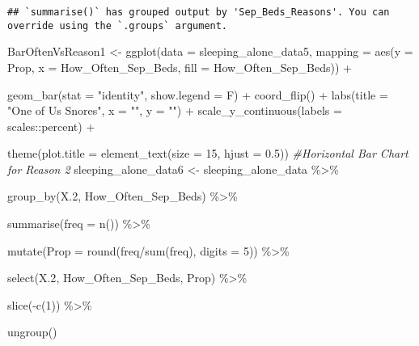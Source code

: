 \documentclass[
]{article}
\newenvironment{Shaded}{\begin{snugshade}}{\end{snugshade}}
\newcommand{\AttributeTok}[1]{\textcolor[rgb]{0.77,0.63,0.00}{#1}}
\newcommand{\CommentTok}[1]{\textcolor[rgb]{0.56,0.35,0.01}{\textit{#1}}}
\newcommand{\DecValTok}[1]{\textcolor[rgb]{0.00,0.00,0.81}{#1}}
\newcommand{\FloatTok}[1]{\textcolor[rgb]{0.00,0.00,0.81}{#1}}
\newcommand{\FunctionTok}[1]{\textcolor[rgb]{0.00,0.00,0.00}{#1}}
\newcommand{\NormalTok}[1]{#1}
\newcommand{\OtherTok}[1]{\textcolor[rgb]{0.56,0.35,0.01}{#1}}
\newcommand{\SpecialCharTok}[1]{\textcolor[rgb]{0.00,0.00,0.00}{#1}}
\newcommand{\StringTok}[1]{\textcolor[rgb]{0.31,0.60,0.02}{#1}}
\begin{document}
\begin{verbatim}
## `summarise()` has grouped output by 'Sep_Beds_Reasons'. You can override using the `.groups` argument.
\end{verbatim}

\begin{Shaded}
\begin{Highlighting}[]
\NormalTok{BarOftenVsReason1 }\OtherTok{\textless{}{-}} \FunctionTok{ggplot}\NormalTok{(}\AttributeTok{data =}\NormalTok{ sleeping\_alone\_data5,}
                               \AttributeTok{mapping =} \FunctionTok{aes}\NormalTok{(}\AttributeTok{y =}\NormalTok{ Prop,}
                                             \AttributeTok{x =}\NormalTok{ How\_Often\_Sep\_Beds,}
                                             \AttributeTok{fill =}\NormalTok{ How\_Often\_Sep\_Beds)) }\SpecialCharTok{+}
  
  \FunctionTok{geom\_bar}\NormalTok{(}\AttributeTok{stat =} \StringTok{"identity"}\NormalTok{,}
           \AttributeTok{show.legend =}\NormalTok{ F) }\SpecialCharTok{+} 
  \FunctionTok{coord\_flip}\NormalTok{() }\SpecialCharTok{+} 
  \FunctionTok{labs}\NormalTok{(}\AttributeTok{title =} \StringTok{"One of Us Snores"}\NormalTok{,}
       \AttributeTok{x =} \StringTok{""}\NormalTok{,}
       \AttributeTok{y =} \StringTok{""}\NormalTok{) }\SpecialCharTok{+}
  \FunctionTok{scale\_y\_continuous}\NormalTok{(}\AttributeTok{labels =}\NormalTok{ scales}\SpecialCharTok{::}\NormalTok{percent) }\SpecialCharTok{+}
  
  \FunctionTok{theme}\NormalTok{(}\AttributeTok{plot.title =} \FunctionTok{element\_text}\NormalTok{(}\AttributeTok{size =} \DecValTok{15}\NormalTok{, }\AttributeTok{hjust =} \FloatTok{0.5}\NormalTok{))}
\CommentTok{\#Horizontal Bar Chart for Reason 2}
\NormalTok{sleeping\_alone\_data6 }\OtherTok{\textless{}{-}}\NormalTok{ sleeping\_alone\_data }\SpecialCharTok{\%\textgreater{}\%} 
  
  \FunctionTok{group\_by}\NormalTok{(X}\FloatTok{.2}\NormalTok{, How\_Often\_Sep\_Beds) }\SpecialCharTok{\%\textgreater{}\%} 
  
  \FunctionTok{summarise}\NormalTok{(}\AttributeTok{freq =} \FunctionTok{n}\NormalTok{()) }\SpecialCharTok{\%\textgreater{}\%} 
  
  \FunctionTok{mutate}\NormalTok{(}\AttributeTok{Prop =} \FunctionTok{round}\NormalTok{(freq}\SpecialCharTok{/}\FunctionTok{sum}\NormalTok{(freq), }\AttributeTok{digits =} \DecValTok{5}\NormalTok{)) }\SpecialCharTok{\%\textgreater{}\%} 
  
  \FunctionTok{select}\NormalTok{(X}\FloatTok{.2}\NormalTok{, How\_Often\_Sep\_Beds, Prop) }\SpecialCharTok{\%\textgreater{}\%} 
  
  \FunctionTok{slice}\NormalTok{(}\SpecialCharTok{{-}}\FunctionTok{c}\NormalTok{(}\DecValTok{1}\NormalTok{)) }\SpecialCharTok{\%\textgreater{}\%} 
  
  \FunctionTok{ungroup}\NormalTok{()}
\end{Highlighting}
\end{Shaded}
\end{document}
